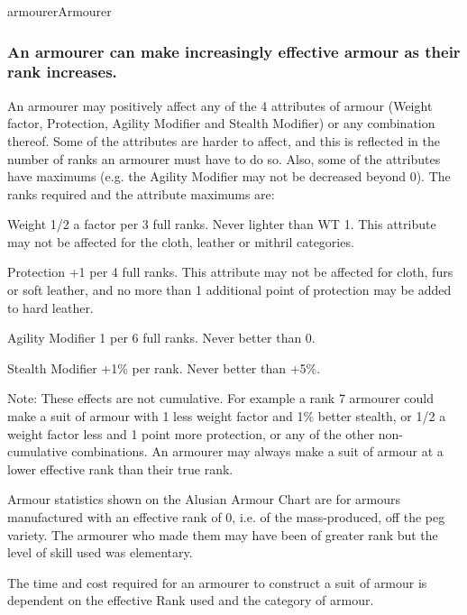 \begin{Skill}[1.3]{armourer}{Armourer}
\subsubsection{An  armourer  can  make  increasingly  effective 
armour as their rank increases.}

An armourer may positively affect any of the 4 attributes of armour
(Weight factor, Protection, Agility Modifier and Stealth Modifier) or
any combination thereof.  Some of the attributes are harder to affect,
and this is reflected in the number of ranks an armourer must have to
do so.  Also, some of the attributes have maximums (e.g.  the Agility
Modifier may not be decreased beyond 0).  The ranks required and the
attribute maximums are:

\begin{Description}
\item[Weight] 1/2 a factor per 3 full ranks. Never lighter than WT 1.
  This attribute may not be affected for the cloth, leather or mithril
  categories.

\item[Protection] +1 per 4 full ranks.  This attribute may not be
  affected for cloth, furs or soft leather, and no more than 1
  additional point of protection may be added to hard leather.

\item[Agility Modifier] 1 per 6 full ranks.  Never better than 0.

\item[Stealth Modifier] +1\% per rank. Never better than +5\%.

\end{Description}

Note: These effects are not cumulative. For example a rank 7 armourer
could make a suit of armour with 1 less weight factor and 1\% better
stealth, or 1/2 a weight factor less and 1 point more protection, or
any of the other non-cumulative combinations.  An armourer may always
make a suit of armour at a lower effective rank than their true rank.

Armour statistics shown on the Alusian Armour Chart are for armours
manufactured with an effective rank of 0, i.e.  of the
mass-produced, off the peg variety.  The armourer who made them may
have been of greater rank but the level of skill used was elementary.

The time and cost required for an armourer to construct a suit of
armour is dependent on the effective Rank used and the category of
armour.


\end{Skill}
